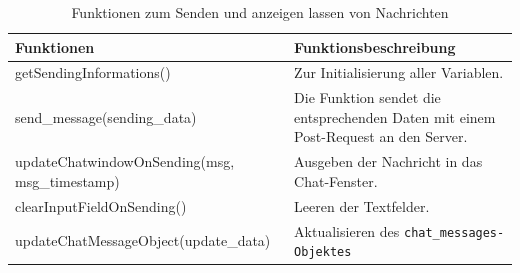 \documentclass[a4paper,titlepage,halfparskip,12pt]{scrreprt}
\begin{document}
\begin{onehalfspacing}
\begin{table}[h]
	\centering
	\caption{Funktionen zum Senden und anzeigen lassen von Nachrichten}
	\begin{tabular}{|p{6cm}|p{8.8cm}|}
		\hline
		\textbf{Funktionen} & \textbf{Funktionsbeschreibung} \\
		\hline
		getSendingInformations() & Zur Initialisierung aller Variablen.\\
		\hline
		send\_message(sending\_data) & Die Funktion sendet die entsprechenden Daten mit einem Post-Request an den Server.\\
		\hline
		updateChatwindowOnSending\linebreak(msg, msg\_timestamp) & Ausgeben der Nachricht in das Chat-Fenster.\\
		\hline
		clearInputFieldOnSending() & Leeren der Textfelder.\\
		\hline
		updateChatMessageObject\linebreak(update\_data) & Aktualisieren des \texttt{chat\_messages-Objektes} \\
		\hline
	\end{tabular}
	\label{tab:SendFunctionsKafka}
\end{table}


\end{onehalfspacing}
\end{document}
